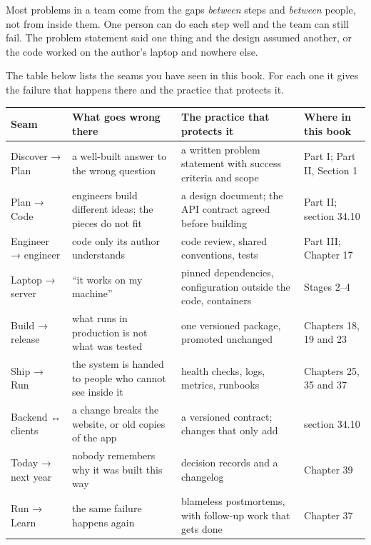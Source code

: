 Most problems in a team come from the gaps \emph{between} steps and \emph{between} people, not from inside them. One person can do each step well and the team can still fail. The problem statement said one thing and the design assumed another, or the code worked on the author's laptop and nowhere else.

The table below lists the seams you have seen in this book. For each one it gives the failure that happens there and the practice that protects it.

{\def\LTcaptype{none} %
\begin{longtable}[]{@{}
  >{\raggedright\arraybackslash}p{}
  >{\raggedright\arraybackslash}p{}
  >{\raggedright\arraybackslash}p{}
  >{\raggedright\arraybackslash}p{}@{}}
\toprule\noalign{}
\begin{minipage}[b]{\linewidth}\raggedright
Seam
\end{minipage} & \begin{minipage}[b]{\linewidth}\raggedright
What goes wrong there
\end{minipage} & \begin{minipage}[b]{\linewidth}\raggedright
The practice that protects it
\end{minipage} & \begin{minipage}[b]{\linewidth}\raggedright
Where in this book
\end{minipage} \\
\midrule\noalign{}
\endhead
\bottomrule\noalign{}
\endlastfoot
Discover → Plan & a well-built answer to the wrong question & a written problem statement with success criteria and scope & Part I; Part II, Section 1 \\
Plan → Code & engineers build different ideas; the pieces do not fit & a design document; the API contract agreed before building & Part II; section 34.10 \\
Engineer → engineer & code only its author understands & code review, shared conventions, tests & Part III; Chapter 17 \\
Laptop → server & ``it works on my machine'' & pinned dependencies, configuration outside the code, containers & Stages 2--4 \\
Build → release & what runs in production is not what was tested & one versioned package, promoted unchanged & Chapters 18, 19 and 23 \\
Ship → Run & the system is handed to people who cannot see inside it & health checks, logs, metrics, runbooks & Chapters 25, 35 and 37 \\
Backend ↔ clients & a change breaks the website, or old copies of the app & a versioned contract; changes that only add & section 34.10 \\
Today → next year & nobody remembers why it was built this way & decision records and a changelog & Chapter 39 \\
Run → Learn & the same failure happens again & blameless postmortems, with follow-up work that gets done & Chapter 37 \\
\end{longtable}
}

